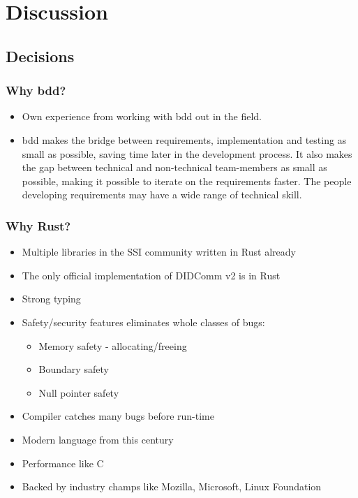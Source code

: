 \chapter{Discussion}

\section{Decisions}

\subsection{Why \acrfull{bdd}?}

\begin{itemize}
\item Own experience from working with \acrshort{bdd} out in the field.
\item \acrshort{bdd} makes the bridge between requirements, implementation and testing as small as possible, saving time later in the development process. It also makes the gap between technical and non-technical team-members as small as possible, making it possible to iterate on the requirements faster. The people developing requirements may have a wide range of technical skill.

\end{itemize}




\subsection{Why Rust?}
\begin{itemize}
\item Multiple libraries in the SSI community written in Rust already
\item The only official implementation of DIDComm v2 is in Rust
\item Strong typing
\item Safety/security features eliminates whole classes of bugs:
    \begin{itemize}
    \item Memory safety - allocating/freeing
    \item Boundary safety
    \item Null pointer safety
    \end{itemize}
\item Compiler catches many bugs before run-time
\item Modern language from this century
\item Performance like C
\item Backed by industry champs like Mozilla, Microsoft, Linux Foundation
\end{itemize}





